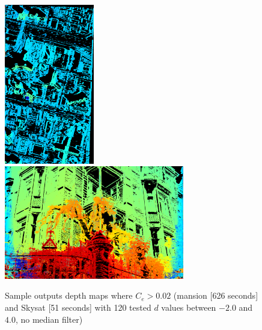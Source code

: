 \documentclass{article}
\theoremstyle{definition}
\begin{document}
\begin{figure}[ht]
  \centering
  \includegraphics[width=0.35\textwidth]{images/1520423162502_dmap.png}
  \includegraphics[width=0.7\textwidth]{images/1520438877175_dmap.png}
  \caption{Sample outputs depth maps where $C_e > 0.02$ (mansion [626 seconds] and Skysat [51 seconds] with 120 tested $d$ values between $-2.0$ and $4.0$, no median filter)}
  \label{fig:wconf:piles}
\end{figure}


\clearpage


\end{document}
